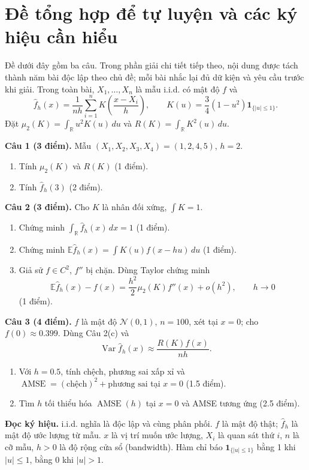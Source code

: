 \documentclass[11pt,a4paper]{article}
\newcommand{\E}{\mathbb E}
\newcommand{\R}{\mathbb R}
\newcommand{\fh}{\widehat f_h}
\DeclareMathOperator{\Var}{Var}
\DeclareMathOperator{\AMSE}{AMSE}
\newcommand{\buoc}[1]{\par\medskip\textbf{#1}\par}
\begin{document}
\section*{Đề tổng hợp để tự luyện và các ký hiệu cần hiểu}
Đề dưới đây gồm ba câu. Trong phần giải chi tiết tiếp theo, nội dung được tách thành năm bài độc lập theo chủ đề; mỗi bài nhắc lại đủ dữ kiện và yêu cầu trước khi giải.
Trong toàn bài, $X_1,\ldots,X_n$ là mẫu i.i.d. có mật độ $f$ và
\[
\fh(x)=\frac{1}{nh}\sum_{i=1}^nK\!\left(\frac{x-X_i}{h}\right),
\qquad K(u)=\frac34(1-u^2)\mathbf1_{\{|u|\leq1\}}.
\]
Đặt $\mu_2(K)=\int_{\R}u^2K(u)\,du$ và $R(K)=\int_{\R}K^2(u)\,du$.

\textbf{Câu 1 (3 điểm).} Mẫu $(X_1,X_2,X_3,X_4)=(1,2,4,5)$, $h=2$.
\begin{enumerate}[label=(\alph*)]
\item Tính $\mu_2(K)$ và $R(K)$ (1 điểm).
\item Tính $\fh(3)$ (2 điểm).
\end{enumerate}
\textbf{Câu 2 (3 điểm).} Cho $K$ là nhân đối xứng, $\int K=1$.
\begin{enumerate}[label=(\alph*)]
\item Chứng minh $\int_{\R}\fh(x)\,dx=1$ (1 điểm).
\item Chứng minh $\E\fh(x)=\int K(u)f(x-hu)\,du$ (1 điểm).
\item Giả sử $f\in C^2$, $f''$ bị chặn. Dùng Taylor chứng minh
\[
\E\fh(x)-f(x)=\frac{h^2}{2}\mu_2(K)f''(x)+o(h^2),\qquad h\to0
\]
(1 điểm).
\end{enumerate}
\textbf{Câu 3 (4 điểm).} $f$ là mật độ $\mathcal N(0,1)$, $n=100$, xét tại $x=0$; cho $f(0)\approx0.399$. Dùng Câu 2(c) và
\[
\Var\fh(x)\approx\frac{R(K)f(x)}{nh}.
\]
\begin{enumerate}[label=(\alph*)]
\item Với $h=0.5$, tính chệch, phương sai xấp xỉ và $\AMSE=(\text{chệch})^2+\text{phương sai}$ tại $x=0$ (1.5 điểm).
\item Tìm $h$ tối thiểu hóa $\AMSE(h)$ tại $x=0$ và AMSE tương ứng (2.5 điểm).
\end{enumerate}

\textbf{Đọc ký hiệu.} i.i.d. nghĩa là độc lập và cùng phân phối. $f$ là mật độ thật; $\fh$ là mật độ ước lượng từ mẫu. $x$ là vị trí muốn ước lượng, $X_i$ là quan sát thứ $i$, $n$ là cỡ mẫu, $h>0$ là độ rộng cửa sổ (bandwidth). Hàm chỉ báo $\mathbf1_{\{|u|\leq1\}}$ bằng 1 khi $|u|\leq1$, bằng 0 khi $|u|>1$.

\clearpage
\begingroup
\setlength{\abovedisplayskip}{6pt}
\setlength{\belowdisplayskip}{6pt}
\setlength{\abovedisplayshortskip}{3pt}
\setlength{\belowdisplayshortskip}{3pt}
\renewcommand{\buoc}[1]{\par\textbf{#1}\par}
\end{document}
